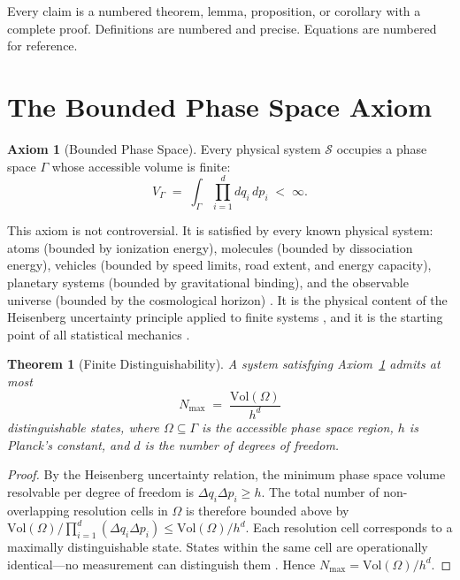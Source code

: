 \documentclass[11pt,twocolumn,a4paper]{article}
\theoremstyle{plain}
\newtheorem{theorem}{Theorem}[section]
\theoremstyle{definition}
\newtheorem{axiom}{Axiom}
\theoremstyle{remark}
\newcommand{\VGamma}{V_{\Gamma}}
\newcommand{\Nmax}{N_{\mathrm{max}}}
\begin{document}
Every claim is a numbered theorem, lemma, proposition, or corollary with a complete proof. Definitions are numbered and precise. Equations are numbered for reference.

\section{The Bounded Phase Space Axiom}
\label{sec:axiom}

\begin{axiom}[Bounded Phase Space]
\label{ax:bounded}
Every physical system $\mathcal{S}$ occupies a phase space $\Gamma$ whose accessible volume is finite:
\begin{equation}
\VGamma \;=\; \int_\Gamma \prod_{i=1}^{d} dq_i \, dp_i \;<\; \infty.
\label{eq:bounded}
\end{equation}
\end{axiom}

This axiom is not controversial. It is satisfied by every known physical system: atoms (bounded by ionization energy), molecules (bounded by dissociation energy), vehicles (bounded by speed limits, road extent, and energy capacity), planetary systems (bounded by gravitational binding), and the observable universe (bounded by the cosmological horizon) \cite{bekenstein1973black}. It is the physical content of the Heisenberg uncertainty principle applied to finite systems \cite{heisenberg1927anschaulichen}, and it is the starting point of all statistical mechanics \cite{boltzmann1896vorlesungen, landau1980statistical}.

\begin{theorem}[Finite Distinguishability]
\label{thm:finite_dist}
A system satisfying Axiom~\ref{ax:bounded} admits at most
\begin{equation}
\Nmax \;=\; \frac{\mathrm{Vol}(\Omega)}{h^d}
\label{eq:nmax}
\end{equation}
distinguishable states, where $\Omega \subseteq \Gamma$ is the accessible phase space region, $h$ is Planck's constant, and $d$ is the number of degrees of freedom.
\end{theorem}

\begin{proof}
By the Heisenberg uncertainty relation, the minimum phase space volume resolvable per degree of freedom is $\Delta q_i \Delta p_i \geq h$. The total number of non-overlapping resolution cells in $\Omega$ is therefore bounded above by $\mathrm{Vol}(\Omega) / \prod_{i=1}^d (\Delta q_i \Delta p_i) \leq \mathrm{Vol}(\Omega)/h^d$. Each resolution cell corresponds to a maximally distinguishable state. States within the same cell are operationally identical---no measurement can distinguish them \cite{heisenberg1927anschaulichen}. Hence $\Nmax = \mathrm{Vol}(\Omega)/h^d$.
\end{proof}
\end{document}
